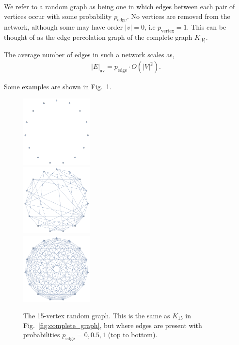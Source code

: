 We refer to a random graph as being one in which edges between each pair of vertices occur with some probability $p_\mathrm{edge}$. No vertices are removed from the network, although some may have order \mbox{$|v|=0$}, i.e \mbox{$p_\mathrm{vertex}=1$}. This can be thought of as the edge percolation graph of the complete graph $K_{|V|}$.

The average number of edges in such a network scales as,
\begin{align}
|E|_\mathrm{av} = p_\mathrm{edge}\cdot O(|V|^2).	
\end{align}

Some examples are shown in Fig.~\ref{fig:random_graph}.

\doublecol
	\begin{figure}[!htbp]
	\includegraphics[clip=true, width=0.325\textwidth]{random_0}\\
	\includegraphics[clip=true, width=0.325\textwidth]{random_05}\\
	\includegraphics[clip=true, width=0.325\textwidth]{random_1}
	\captionspacefig \caption{The 15-vertex random graph. This is the same as $K_{15}$ in Fig.~\ref{fig:complete_graph}, but where edges are present with probabilities \mbox{$p_\mathrm{edge}=0,0.5,1$} (top to bottom).} \label{fig:random_graph}
	\end{figure}
